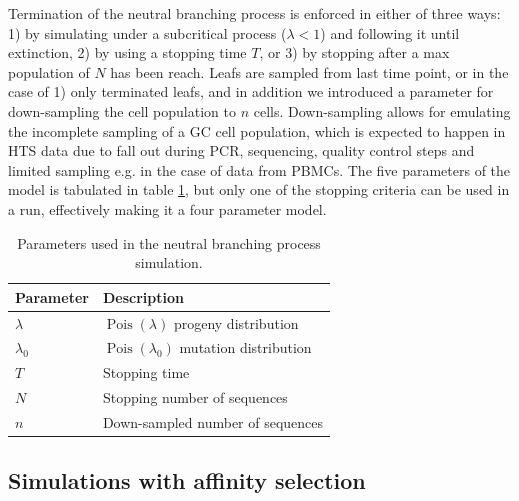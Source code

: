 Termination of the neutral branching process is enforced in either of three ways: 1) by simulating under a subcritical process ($\lambda < 1$) \cite{gwp} and following it until extinction, 2) by using a stopping time $T$, or 3) by stopping after a max population of $N$ has been reach.
Leafs are sampled from last time point, or in the case of 1) only terminated leafs, and in addition we introduced a parameter for down-sampling the cell population to $n$ cells.
Down-sampling allows for emulating the incomplete sampling of a GC cell population, which is expected to happen in HTS data due to fall out during PCR, sequencing, quality control steps and limited sampling e.g. in the case of data from PBMCs.
The five parameters of the model is tabulated in table \ref{neut_constants}, but only one of the stopping criteria can be used in a run, effectively making it a four parameter model.

\begin{table}[ht]
\centering
\begin{tabular}{ll}
Parameter    & Description \\ \hline
$\lambda$ & $\operatorname{Pois}(\lambda)$ progeny distribution \\
$\lambda_0$ & $\operatorname{Pois}(\lambda_0)$ mutation distribution \\
$T$ & Stopping time \\
$N$ & Stopping number of sequences \\
$n$ & Down-sampled number of sequences
\end{tabular}
\caption{
\label{neut_constants}
    Parameters used in the neutral branching process simulation.}
\end{table}






\subsection{Simulations with affinity selection}

